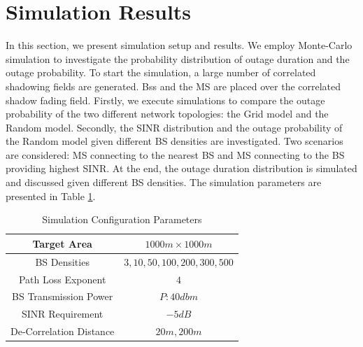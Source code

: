  \section{Simulation Results}
 \label{4:SimuProb}
 \par In this section, we present simulation setup and results. We employ Monte-Carlo simulation to investigate the probability distribution of outage duration and the outage probability. To start the simulation, a large number of correlated shadowing fields are generated. Bss and the MS are placed over the correlated shadow fading field. Firstly, we execute simulations to compare the outage probability of the two different network topologies: the Grid model and the Random model. Secondly, the SINR distribution and the outage probability of the Random model given different BS densities are investigated. Two scenarios are considered: MS connecting to the nearest BS and MS connecting to the BS providing highest SINR. At the end, the outage duration distribution is simulated and discussed given different BS densities. The simulation parameters are presented in Table \ref{SystemConfig2}. 
 \begin{table}
 \centering
 \caption{\label{SystemConfig2}Simulation Configuration Parameters}

 \begin{tabular}{|c|c|}

 \hline
 Target Area & $1000m\times 1000m$\\
 \hline
 BS Densities & $3, 10, 50, 100, 200, 300, 500$\\
 \hline
 Path Loss Exponent & $4$\\
 \hline
 BS Transmission Power & $P: 40dbm$\\
 \hline
 SINR Requirement & $-5dB$\\
 \hline
 De-Correlation Distance & $20m, 200m$\\
 \hline
 \end{tabular}

 \end{table}

